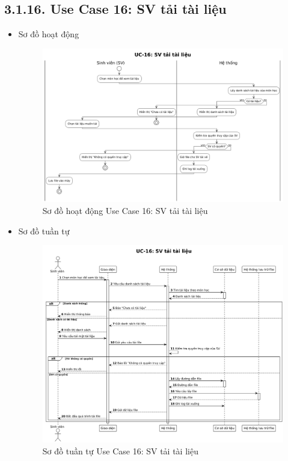 \subsection*{3.1.16. Use Case 16: SV tải tài liệu}
\begin{itemize}
    \item Sơ đồ hoạt động
    \begin{figure}[H]
    \centering
    \includegraphics[scale=0.35 ]{Picture/ACUC16.png}
    \caption{Sơ đồ hoạt động Use Case 16: SV tải tài liệu}
    \end{figure}
    \item Sơ đồ tuần tự
    \begin{figure}[H]
    \centering
    \includegraphics[scale=0.35 ]{Picture/SEUC16.png}
    \caption{Sơ đồ tuần tự Use Case 16: SV tải tài liệu}
    \end{figure}
\end{itemize}
